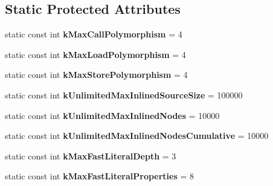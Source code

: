 \subsection*{Static Protected Attributes}
\begin{DoxyCompactItemize}
\item 
static const int {\bfseries k\+Max\+Call\+Polymorphism} = 4\hypertarget{classv8_1_1internal_1_1_h_optimized_graph_builder_a3712b01f930e17c9602736ba6a3fb92d}{}\label{classv8_1_1internal_1_1_h_optimized_graph_builder_a3712b01f930e17c9602736ba6a3fb92d}

\item 
static const int {\bfseries k\+Max\+Load\+Polymorphism} = 4\hypertarget{classv8_1_1internal_1_1_h_optimized_graph_builder_a5bf6385044d3a666aa37a7d1f3f9ed23}{}\label{classv8_1_1internal_1_1_h_optimized_graph_builder_a5bf6385044d3a666aa37a7d1f3f9ed23}

\item 
static const int {\bfseries k\+Max\+Store\+Polymorphism} = 4\hypertarget{classv8_1_1internal_1_1_h_optimized_graph_builder_a0f3561465592972e1f9bc03385675130}{}\label{classv8_1_1internal_1_1_h_optimized_graph_builder_a0f3561465592972e1f9bc03385675130}

\item 
static const int {\bfseries k\+Unlimited\+Max\+Inlined\+Source\+Size} = 100000\hypertarget{classv8_1_1internal_1_1_h_optimized_graph_builder_adeea843015bf89f5ed482d67fdfab410}{}\label{classv8_1_1internal_1_1_h_optimized_graph_builder_adeea843015bf89f5ed482d67fdfab410}

\item 
static const int {\bfseries k\+Unlimited\+Max\+Inlined\+Nodes} = 10000\hypertarget{classv8_1_1internal_1_1_h_optimized_graph_builder_a0d3ca7dd0450c227acbc02baf590780f}{}\label{classv8_1_1internal_1_1_h_optimized_graph_builder_a0d3ca7dd0450c227acbc02baf590780f}

\item 
static const int {\bfseries k\+Unlimited\+Max\+Inlined\+Nodes\+Cumulative} = 10000\hypertarget{classv8_1_1internal_1_1_h_optimized_graph_builder_a76c96c836bf49c16b402f1df29a26f6b}{}\label{classv8_1_1internal_1_1_h_optimized_graph_builder_a76c96c836bf49c16b402f1df29a26f6b}

\item 
static const int {\bfseries k\+Max\+Fast\+Literal\+Depth} = 3\hypertarget{classv8_1_1internal_1_1_h_optimized_graph_builder_aebc314e5ae3c8a3c3e85ff1814ae2128}{}\label{classv8_1_1internal_1_1_h_optimized_graph_builder_aebc314e5ae3c8a3c3e85ff1814ae2128}

\item 
static const int {\bfseries k\+Max\+Fast\+Literal\+Properties} = 8\hypertarget{classv8_1_1internal_1_1_h_optimized_graph_builder_a7d51fbacedd0cefb0f48ee14b02fa274}{}\label{classv8_1_1internal_1_1_h_optimized_graph_builder_a7d51fbacedd0cefb0f48ee14b02fa274}

\end{DoxyCompactItemize}
